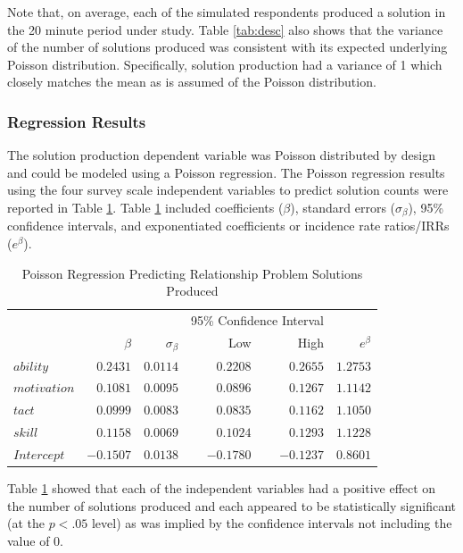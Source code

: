 \documentclass[man]{apa7}
\begin{document}
	Note that, on average, each of the simulated respondents produced a solution in the 20 minute period under study.
	Table \ref{tab:desc} also shows that the variance of the number of solutions produced was consistent with its expected underlying Poisson distribution.
	Specifically, solution production had a variance of 1 which closely matches the mean as is assumed of the Poisson distribution. 

		\subsubsection{Regression Results}
		
	The solution production dependent variable was Poisson distributed by design and could be modeled using a Poisson regression.
	The Poisson regression results using the four survey scale independent variables to predict solution counts were reported in Table \ref{tab:poisreg}. 
	Table \ref{tab:poisreg} included coefficients ($\beta$), standard errors ($\sigma_{\beta}$), 95\% confidence intervals, and exponentiated coefficients or incidence rate ratios/IRRs ($e^{\beta}$).
	
	\begin{table}[h!]
		\centering
		\caption{\centering Poisson Regression Predicting Relationship Problem Solutions Produced} 
		\begin{tabular}{l|rrrrr}
			\hline 
			\multicolumn{1}{l}{} &  &  & \multicolumn{2}{c}{95\% Confidence Interval} &   \\ 
			\multicolumn{1}{l}{} & $\beta$ & $\sigma_{\beta}$ & Low & High & $e^{\beta}$ \\ 
			\hline 
			$ability$ & $0.2431$ & $0.0114$ & $0.2208$ & $0.2655$ & $1.2753$ \\  
			$motivation$ & $0.1081$ & $0.0095$ & $0.0896$ & $0.1267$ & $1.1142$ \\ 
			$tact$ & $0.0999$ & $0.0083$ & $0.0835$ & $0.1162$ & $1.1050$ \\
			$skill$ & $0.1158$ & $0.0069$ & $0.1024$ & $0.1293$ & $1.1228$ \\ 
			$Intercept$ & $-0.1507$ & $0.0138$ & $-0.1780$ & $-0.1237$ & $0.8601$ \\
			\hline 
		\end{tabular}
		\label{tab:poisreg}
	\end{table}
	
	Table \ref{tab:poisreg} showed that each of the independent variables had a positive effect on the number of solutions produced and each appeared to be statistically significant (at the $p < .05$ level) as was implied by the confidence intervals not including the value of 0.
	
\end{document}

